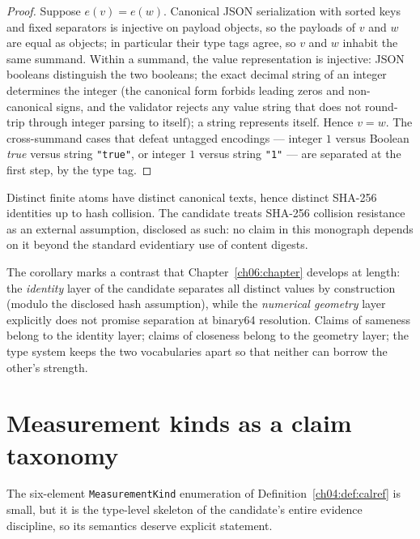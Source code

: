 \begin{proof}
Suppose $e(v) = e(w)$. Canonical JSON serialization with sorted keys and
fixed separators is injective on payload objects, so the payloads of $v$
and $w$ are equal as objects; in particular their type tags agree, so $v$
and $w$ inhabit the same summand. Within a summand, the value
representation is injective: JSON booleans distinguish the two booleans;
the exact decimal string of an integer determines the integer (the
canonical form forbids leading zeros and non-canonical signs, and the
validator rejects any value string that does not round-trip through
integer parsing to itself); a string represents itself. Hence $v = w$.
The cross-summand cases that defeat untagged encodings --- integer $1$
versus Boolean \emph{true} versus string \texttt{"true"}, or integer $1$
versus string \texttt{"1"} --- are separated at the first step, by the
type tag.
\end{proof}

\begin{corollary}
\label{ch04:cor:digest}
Distinct finite atoms have distinct canonical texts, hence distinct
SHA-256 identities up to hash collision. The candidate treats SHA-256
collision resistance as an external assumption, disclosed as such: no
claim in this monograph depends on it beyond the standard evidentiary use
of content digests.
\end{corollary}

The corollary marks a contrast that Chapter~\ref{ch06:chapter} develops at
length: the \emph{identity} layer of the candidate separates all distinct
values by construction (modulo the disclosed hash assumption), while the
\emph{numerical geometry} layer explicitly does not promise separation at
binary64 resolution. Claims of sameness belong to the identity layer;
claims of closeness belong to the geometry layer; the type system keeps
the two vocabularies apart so that neither can borrow the other's
strength.

\section{Measurement kinds as a claim taxonomy}\label{ch04:sec:measkinds}

The six-element \texttt{MeasurementKind} enumeration of
Definition~\ref{ch04:def:calref} is small, but it is the type-level
skeleton of the candidate's entire evidence discipline, so its semantics
deserve explicit statement.

